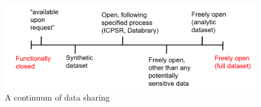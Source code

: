 \documentclass[authordate, empirical]{jote-new-article}
\begin{document}
\begin{figure}
  \begin{fullwidth}
    \includegraphics[width=\linewidth]{media/image1.png}

    \caption{A continuum of data sharing}

    \label{fig:rId10}

  \end{fullwidth}

\end{figure}
\end{document}
